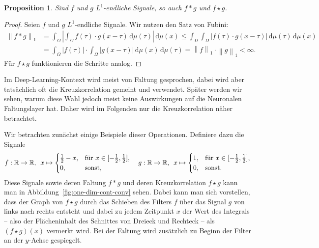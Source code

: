 \documentclass[paper=a4, 	%
		fontsize=11pt,
		abstract=true, 	%
		headsepline, 	%
		notitlepage	%
		]{scrartcl}
\newtheorem{proposition}[theorem]{Proposition}
\theoremstyle{definition}
\newcommand{\R}{\mathbb{R}}
\newcommand{\diff}{\,\textrm{d}}
\newcommand{\norm}[1]{\left\lVert#1\right\rVert}
\newcommand{\abs}[1]{\left\lvert#1\right\rvert}
\begin{document}
\begin{proposition}
    Sind $f$ und $g$ $L^1$-endliche Signale, so auch $f * g$ und $f\star g$.
\end{proposition}
\begin{proof}
    Seien $f$ und $g$ $L^1$-endliche Signale. Wir nutzen den Satz von Fubini:
    \begin{align*}
        \norm{f * g}_1
        &= \int_{\Omega} \abs{ \int_\Omega f(\tau)\cdot g(x - \tau) \diff\mu(\tau) }\diff \mu(x)
        \leq \int_{\Omega}  \int_{\Omega} \abs{f(\tau)\cdot g(x - \tau)} \diff\mu(\tau) \diff \mu(x)\\
        &= \int_{\Omega} \abs{f(\tau)} \cdot \int_{\Omega} \abs{g(x-\tau)} \diff \mu(x) \diff\mu(\tau)
        = \norm{f}_1 \cdot \norm{g}_1 < \infty.
    \end{align*}
    Für $f \star g$ funktionieren die Schritte analog.
\end{proof}

Im Deep-Learning-Kontext wird meist von Faltung gesprochen, dabei wird aber tat\-säch\-lich oft die Kreuzkorrelation gemeint und verwendet.
Später werden wir sehen, warum diese Wahl jedoch meist keine Auswirkungen auf die Neuronalen Faltungslayer hat.
Daher wird im Folgenden nur die Kreuzkorrelation näher betrachtet.

Wir betrachten zunächst einige Beispiele dieser Operationen.
Definiere dazu die Signale
\begin{align*}
    f: \R \rightarrow \R, \hspace{0.5em} x \mapsto \begin{cases}
        \frac{1}{2} - x, & \text{für $x\in[-\frac{1}{2},\frac{1}{2}]$,}\\
        0, & \text{sonst,}
    \end{cases} \quad
    g: \R \rightarrow \R,\hspace{0.5em} x \mapsto \begin{cases}
        1,& \text{für $x \in [-\frac{1}{2},\frac{1}{2}]$,}\\
        0, & \text{sonst.}
    \end{cases}
\end{align*}
Diese Signale sowie deren Faltung $f * g$ und deren Kreuzkorrelation $f\star g$ kann man in Abbildung~\ref{fig:one-dim-cont-conv} sehen.
Dabei kann man sich vorstellen, dass der Graph von $f \star g$ durch das Schieben des Filters $f$ über das Signal $g$ von links nach rechts entsteht und dabei zu jedem Zeitpunkt $x$ der Wert des Integrals -- also der Flächeninhalt des Schnittes von Dreieck und Rechteck -- als $(f\star g)(x)$ vermerkt wird.
Bei der Faltung wird zusätzlich zu Beginn der Filter an der $y$-Achse gespiegelt.
\end{document}

